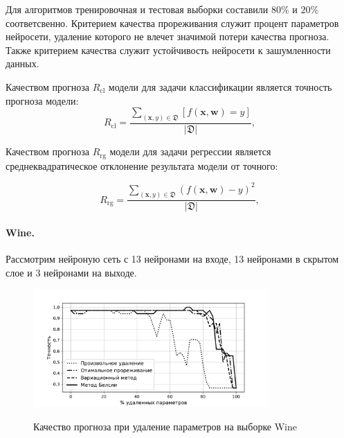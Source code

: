 Для алгоритмов тренировочная и тестовая выборки составили $80\%$ и $20\%$ соответсвенно. Критерием качества прореживания служит процент параметров нейросети, удаление которого не влечет значимой потери качества прогноза. Также критерием качества служит устойчивость нейросети к зашумленности данных. 

Качеством прогноза $R_{\text{cl}}$ модели для задачи классификации является точность прогноза модели:
\[
R_{\text{cl}} = \frac{\sum_{(\textbf{x},y)\in \mathfrak{D}} [f(\textbf{x}, \textbf{w}) = y]}{\left|\mathfrak{D}\right|},
\]

Качеством прогноза $R_{\text{rg}} $ модели для задачи регрессии является среднеквадратическое отклонение результата модели от точного:

\[
R_{\text{rg}} = \frac{\sum_{(\textbf{x},y)\in \mathfrak{D}} \left(f(\textbf{x}, \textbf{w}) - y\right)^2}{\left|\mathfrak{D}\right|},
\]

\paragraph{Wine.} Рассмотрим нейроную сеть с 13 нейронами на входе, 13 нейронами в скрытом слое и 3 нейронами на выходе.

\begin{figure}[h!t]\center
\includegraphics[width=0.8\textwidth]{results/relevant/WIne/All.pdf}\\
\caption{Качество прогноза при удаление параметров на выборке Wine}
\label{WineAll}
\end{figure}

